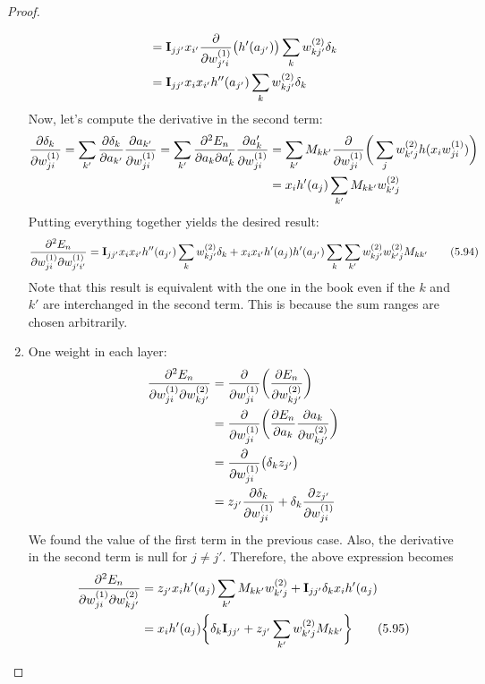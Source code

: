 \begin{proof}
\begin{enumerate}
\begin{align*}
            &= \mathbf{I}_{jj'} x_{i'} \pdv{w_{j'i}^{(1)}} \big(h'(a_{j'})\big) \sum_{k} w_{kj'}^{(2)} \delta_k \\
            &= \mathbf{I}_{jj'} x_i x_{i'} h''(a_{j'}) \sum_{k} w_{kj'}^{(2)} \delta_k
        \end{align*}
        Now, let's compute the derivative in the second term:
        \begin{align*}
            \pdv{\delta_k}{w_{ji}^{(1)}} 
            = \sum_{k'} \pdv{\delta_k}{a_{k'}} \pdv{a_{k'}}{w_{ji}^{(1)}}
            = \sum_{k'} \pdv{E_n}{a_k}{a_k'} \pdv{a_k'}{w_{ji}^{(1)}}
            &= \sum_{k'} M_{kk'} \pdv{w_{ji}^{(1)}}\bigg(\sum_{j} w_{k'j}^{(2)} h(x_i w_{ji}^{(1)})\bigg) \\
            &= x_i h'(a_j) \sum_{k'} M_{kk'} w_{k'j}^{(2)}
        \end{align*}
        Putting everything together yields the desired result:
        \begin{align*}
            \pdv{E_n}{w_{ji}^{(1)}}{w_{j'i'}^{(1)}}
            = \mathbf{I}_{jj'} x_i x_{i'} h''(a_{j'}) \sum_{k} w_{kj'}^{(2)} \delta_k +
            x_i x_{i'} h'(a_j) h'(a_{j'}) \sum_{k} \sum_{k'} w_{kj'}^{(2)} w_{k'j}^{(2)} M_{kk'}
            \tag{5.94}\label{eq:5.94}
        \end{align*}
        Note that this result is equivalent with the one in the book even if the $k$ and $k'$ are
        interchanged in the second term. This is because the sum ranges are chosen arbitrarily.
    \item One weight in each layer:
        \begin{align*}
            \pdv{E_n}{w_{ji}^{(1)}}{w_{kj'}^{(2)}}
            &= \pdv{w_{ji}^{(1)}} \bigg(\pdv{E_n}{w_{kj'}^{(2)}}\bigg) \\
            &= \pdv{w_{ji}^{(1)}} \bigg(\pdv{E_n}{a_{k}} \pdv{a_k}{w_{kj'}^{(2)}}\bigg) \\
            &= \pdv{w_{ji}^{(1)}} \big(\delta_{k} z_{j'}\big) \\ 
            &= z_{j'} \pdv{\delta_k}{w_{ji}^{(1)}} + \delta_k \pdv{z_{j'}}{w_{ji}^{(1)}}
        \end{align*}
        We found the value of the first term in the previous case. Also, the derivative
        in the second term is null for $j \neq j'$. Therefore, the above expression becomes
        \begin{align*}
            \pdv{E_n}{w_{ji}^{(1)}}{w_{kj'}^{(2)}}
            &= z_{j'} x_i h'(a_j) \sum_{k'} M_{kk'} w_{k'j}^{(2)} + 
            \mathbf{I}_{jj'} \delta_k x_i h'(a_j) \\
            &= x_i h'(a_j) \bigg\{\delta_k \mathbf{I}_{jj'} + z_{j'} \sum_{k'} w_{k'j}^{(2)} M_{kk'}\bigg\} 
            \tag{5.95}\label{eq:5.95}
        \end{align*}
    \end{enumerate}
\end{proof}

